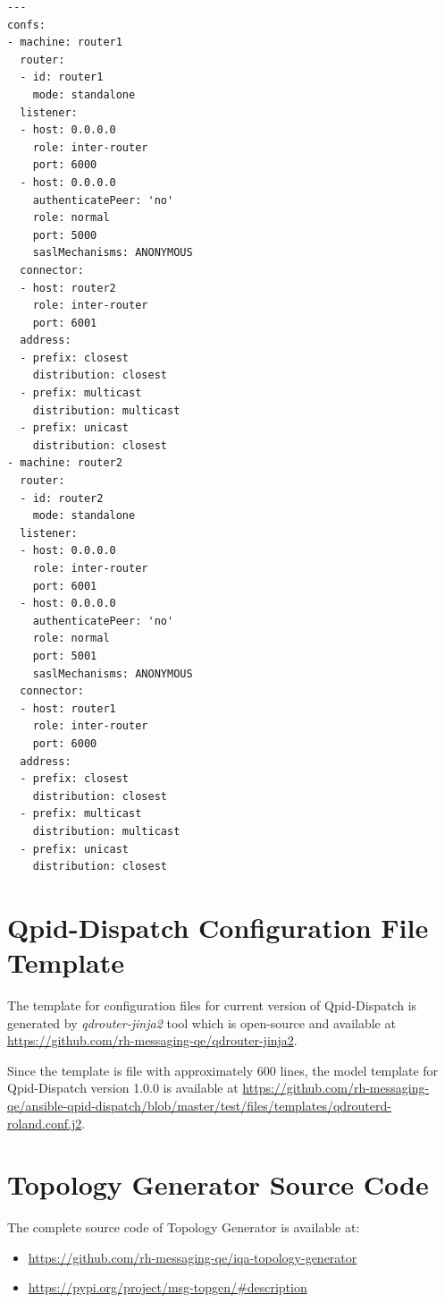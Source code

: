 \begin{verbatim}
---
confs:
- machine: router1
  router:
  - id: router1
    mode: standalone
  listener:
  - host: 0.0.0.0
    role: inter-router
    port: 6000
  - host: 0.0.0.0
    authenticatePeer: 'no'
    role: normal
    port: 5000
    saslMechanisms: ANONYMOUS
  connector:
  - host: router2
    role: inter-router
    port: 6001
  address:
  - prefix: closest
    distribution: closest
  - prefix: multicast
    distribution: multicast
  - prefix: unicast
    distribution: closest
- machine: router2
  router:
  - id: router2
    mode: standalone
  listener:
  - host: 0.0.0.0
    role: inter-router
    port: 6001
  - host: 0.0.0.0
    authenticatePeer: 'no'
    role: normal
    port: 5001
    saslMechanisms: ANONYMOUS
  connector:
  - host: router1
    role: inter-router
    port: 6000
  address:
  - prefix: closest
    distribution: closest
  - prefix: multicast
    distribution: multicast
  - prefix: unicast
    distribution: closest

\end{verbatim}

\section*{Qpid-Dispatch Configuration File Template}
\label{AP:Qpid-Dispatch Configuration File Template}
The template for configuration files for current version of Qpid-Dispatch is generated by \emph{qdrouter-jinja2} tool which is open-source and available at \url{https://github.com/rh-messaging-qe/qdrouter-jinja2}.

Since the template is file with approximately 600 lines, the model template for Qpid-Dispatch version 1.0.0 is available at \url{https://github.com/rh-messaging-qe/ansible-qpid-dispatch/blob/master/test/files/templates/qdrouterd-roland.conf.j2}.

\section*{Topology Generator Source Code}
\label{AP:Topology Generator Source Code}
The complete source code of Topology Generator is available at:
\begin{itemize}
  \item \url{https://github.com/rh-messaging-qe/iqa-topology-generator}
  \item \url{https://pypi.org/project/msg-topgen/#description}
\end{itemize}


